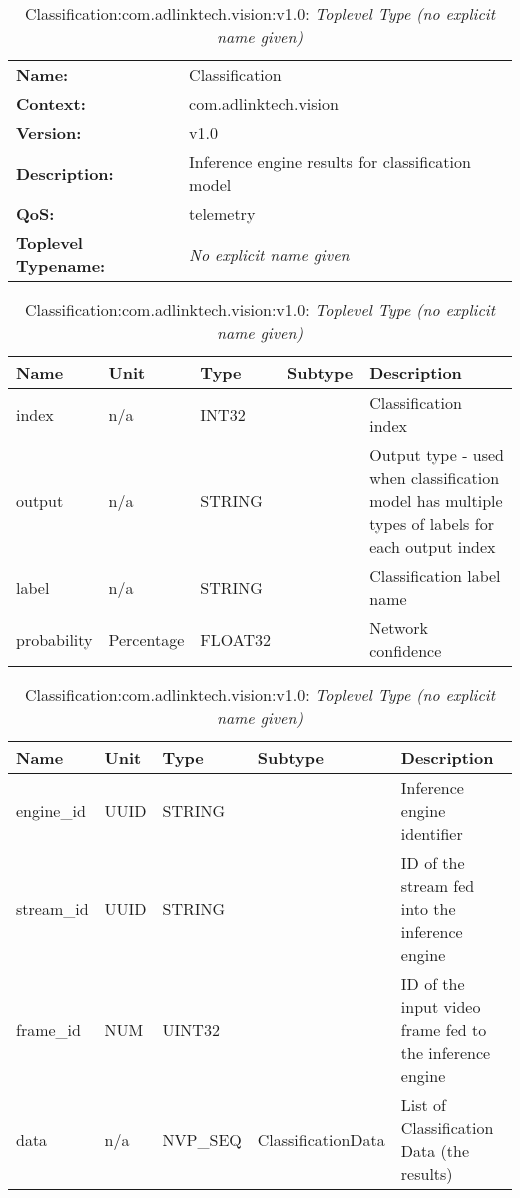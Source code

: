 \begin{table}[H]
\begin{tabularx}{\textwidth}{l X} 
       \textbf{Name:} & Classification \\ 
	   \textbf{Context:} & com.adlinktech.vision \\ 
	   \textbf{Version:} & v1.0 \\ 
	   \textbf{Description:} & Inference engine results for classification model \\ 
	   \textbf{QoS:} & telemetry \\
	   \textbf{Toplevel Typename:} & \textit{No explicit name given} \\ 
\end{tabularx}
\caption{Classification:com.adlinktech.vision:v1.0}\label{ClassificationTagGroup.json:table:Classification}
\bigskip
\begin{tabularx}{\textwidth}{l l l l X} 
	 \textbf{Name} & \textbf{Unit} & \textbf{Type} & \textbf{Subtype} & \textbf{Description} \\
	 \midrule
   index & n/a & INT32 &  & Classification index \\
   output & n/a & STRING &  & Output type - used when classification model has multiple types of labels for each output index \\
   label & n/a & STRING &  & Classification label name \\
   probability & Percentage & FLOAT32 &  & Network confidence \\
\end{tabularx}
\caption{Classification:com.adlinktech.vision:v1.0: ClassificationData}\label{ClassificationTagGroup.json:table:Classification-ClassificationData}

\bigskip
\begin{tabularx}{\textwidth}{l l l l X} 
	 \textbf{Name} & \textbf{Unit} & \textbf{Type} & \textbf{Subtype} & \textbf{Description} \\
	 \midrule
   engine\_id & UUID & STRING &  & Inference engine identifier \\
   stream\_id & UUID & STRING &  & ID of the stream fed into the inference engine \\
   frame\_id & NUM & UINT32 &  & ID of the input video frame fed to the inference engine \\
   data & n/a & NVP\_SEQ & ClassificationData & List of Classification Data (the results) \\
\end{tabularx}
\caption{Classification:com.adlinktech.vision:v1.0: \textit{Toplevel Type (no explicit name given)}}\label{ClassificationTagGroup.json:table:Classification-no-type-given}


\end{table}

